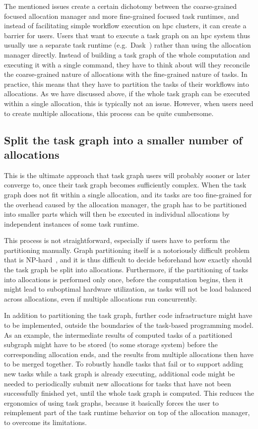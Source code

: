 The mentioned issues create a certain dichotomy between the coarse-grained focused allocation
manager and more fine-grained focused task runtimes, and instead of facilitating simple workflow
execution on \gls{hpc} clusters, it can create a barrier for users. Users that
want to execute a task graph on an \gls{hpc} system thus usually use a separate
task runtime (e.g.\ Dask~\cite{dask}) rather than using the allocation manager
directly. Instead of building a task graph of the whole computation and executing it with a single
command, they have to think about will they reconcile the coarse-grained nature of allocations with
the fine-grained nature of tasks. In practice, this means that they have to partition the tasks of
their workflows into allocations. As we have discussed above, if the whole task graph can be
executed within a single allocation, this is typically not an issue. However, when users need to
create multiple allocations, this process can be quite cumbersome.

\subsection*{Split the task graph into a smaller number of allocations}
This is the ultimate approach that task graph users will probably sooner or later converge to, once
their task graph becomes sufficiently complex. When the task graph does not fit within a single
allocation, and its tasks are too fine-grained for the overhead caused by the allocation manager,
the graph has to be partitioned into smaller parts which will then be executed in individual
allocations by independent instances of some task runtime.

This process is not straightforward, especially if users have to perform the partitioning manually.
Graph partitioning itself is a notoriously difficult problem that is
NP-hard~\cite{graph_partitioning}, and it is thus difficult to decide
beforehand how exactly should the task graph be split into allocations. Furthermore, if the
partitioning of tasks into allocations is performed only once, before the computation begins, then
it might lead to suboptimal hardware utilization, as tasks will not be load balanced across
allocations, even if multiple allocations run concurrently.

In addition to partitioning the task graph, further code infrastructure might have to be
implemented, outside the boundaries of the task-based programming model. As an example, the
intermediate results of computed tasks of a partitioned subgraph might have to be stored (to some
storage system) before the corresponding allocation ends, and the results from multiple allocations
then have to be merged together. To robustly handle tasks that fail or to support adding new tasks
while a task graph is already executing, additional code might be needed to periodically submit new
allocations for tasks that have not been successfully finished yet, until the whole task graph is
computed. This reduces the ergonomics of using task graphs, because it basically forces the user to
reimplement part of the task runtime behavior on top of the allocation manager, to overcome its
limitations.

